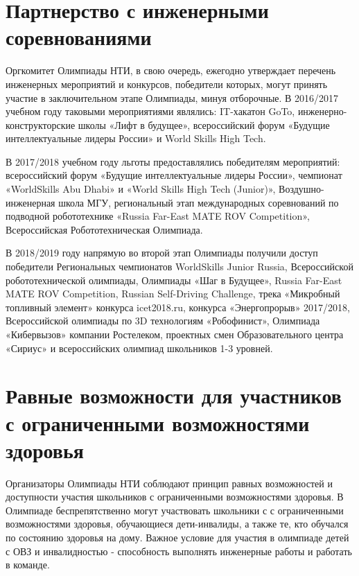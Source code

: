 \section*{Партнерство с инженерными соревнованиями}

Оргкомитет Олимпиады НТИ, в свою очередь, ежегодно утверждает перечень инженерных мероприятий и конкурсов, победители которых, могут принять участие в заключительном этапе Олимпиады, минуя отборочные. В 2016/2017 учебном году таковыми мероприятиями являлись: IT-хакатон GoTo, инженерно-конструкторские школы «Лифт в будущее»,  всероссийский форум «Будущие интеллектуальные лидеры России» и World Skills High Tech. 

В 2017/2018 учебном году льготы предоставлялись победителям мероприятий: всероссийский форум «Будущие интеллектуальные лидеры России», чемпионат \linebreak «WorldSkills Abu Dhabi» и «World Skills High Tech (Junior)», Воздушно-инженерная школа МГУ, региональный этап международных соревнований по подводной робототехнике «Russia Far-East MATE ROV Competition», Всероссийская Робототехническая Олимпиада.

В 2018/2019 году напрямую во второй этап Олимпиады получили доступ победители Региональных чемпионатов WorldSkills Junior Russia, Всероссийской робототехнической олимпиады, Олимпиады «Шаг в Будущее», Russia Far-East MATE ROV Competition, Russian Self-Driving Challenge, трека «Микробный топливный элемент» конкурса icet2018.ru, конкурса «Энергопрорыв» 2017/2018, Всероссийской олимпиады по 3D технологиям «Робофинист», Олимпиада «Кибервызов» компании Ростелеком, проектных смен Образовательного центра «Сириус» и всероссийских олимпиад школьников 1-3 уровней.

\section*{Равные возможности для участников с  ограниченными возможностями здоровья}

Организаторы Олимпиады НТИ соблюдают принцип равных возможностей и доступности участия школьников с ограниченными возможностями здоровья. В Олимпиаде беспрепятственно могут участвовать школьники с с ограниченными возможностями здоровья, обучающиеся дети-инвалиды, а также те, кто обучался по состоянию здоровья на дому. Важное условие для участия в олимпиаде детей с ОВЗ и инвалидностью - способность выполнять инженерные работы и работать в команде.


